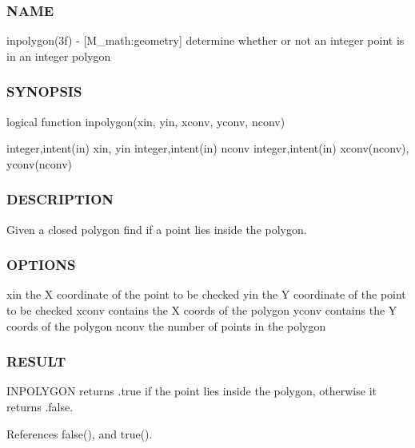 \subsubsection*{N\+A\+ME}

inpolygon(3f) -\/ \mbox{[}M\+\_\+math\+:geometry\mbox{]} determine whether or not an integer point is in an integer polygon 

\subsubsection*{S\+Y\+N\+O\+P\+S\+IS}

\begin{DoxyVerb} logical function inpolygon(xin, yin, xconv, yconv, nconv)

  integer,intent(in)  xin, yin
  integer,intent(in)  nconv
  integer,intent(in)  xconv(nconv), yconv(nconv)
\end{DoxyVerb}


\subsubsection*{D\+E\+S\+C\+R\+I\+P\+T\+I\+ON}

Given a closed polygon find if a point lies inside the polygon.

\subsubsection*{O\+P\+T\+I\+O\+NS}

xin the X coordinate of the point to be checked yin the Y coordinate of the point to be checked xconv contains the X coords of the polygon yconv contains the Y coords of the polygon nconv the number of points in the polygon

\subsubsection*{R\+E\+S\+U\+LT}

I\+N\+P\+O\+L\+Y\+G\+ON returns .true if the point lies inside the polygon, otherwise it returns .false. 

References false(), and true().

